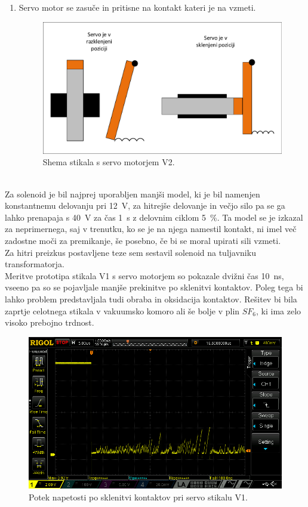 \documentclass[a4paper,twoside,openright,12pt,Slovene]{book}
\begin{document}
\begin{enumerate}
    \item  Servo motor se zasuče in pritisne na kontakt kateri je na vzmeti.
    \begin{figure}[H]
        \centering
        \includegraphics[width=0.9\columnwidth]{Sheme/StikaloServoVerzija2.pdf}
        \caption{\label{StikaloServoVerzija2} Shema stikala s servo motorjem V2.}
    \end{figure}
\end{enumerate}


~\\Za solenoid je bil najprej uporabljen manjši model, ki je bil namenjen konstantnemu delovanju pri \SI{12}{\volt}, za hitrejše delovanje in večjo silo pa se ga lahko prenapaja s \SI{40}{\volt} za čas  \SI{1}{\second} z delovnim ciklom \SI{5}{\percent}. Ta model se je izkazal za neprimernega, saj v trenutku, ko se je na njega namestil kontakt, ni imel več zadostne moči za premikanje, še posebno, če bi se moral upirati sili vzmeti. 
~\\Za hitri preizkus postavljene teze sem sestavil solenoid na tuljavniku transformatorja. 
~\\Meritve prototipa stikala V1 s servo motorjem so pokazale dvižni čas \SI{10}{\nano\second}, vseeno pa so se pojavljale manjše prekinitve po sklenitvi kontaktov. Poleg tega bi lahko problem predstavljala tudi obraba in oksidacija kontaktov. Rešitev bi bila zaprtje celotnega stikala v vakuumsko komoro ali še bolje v plin $SF_{6}$, ki ima zelo visoko prebojno trdnost.
    
    \begin{figure}[H]
        \centering
        \includegraphics[width=1\columnwidth]{Slike/ServoStikalo1/ServoStikalo1.png}
        \caption{\label{ServoStikalo1} Potek napetosti po sklenitvi kontaktov pri servo stikalu V1.}
    \end{figure}
    
\end{document}
